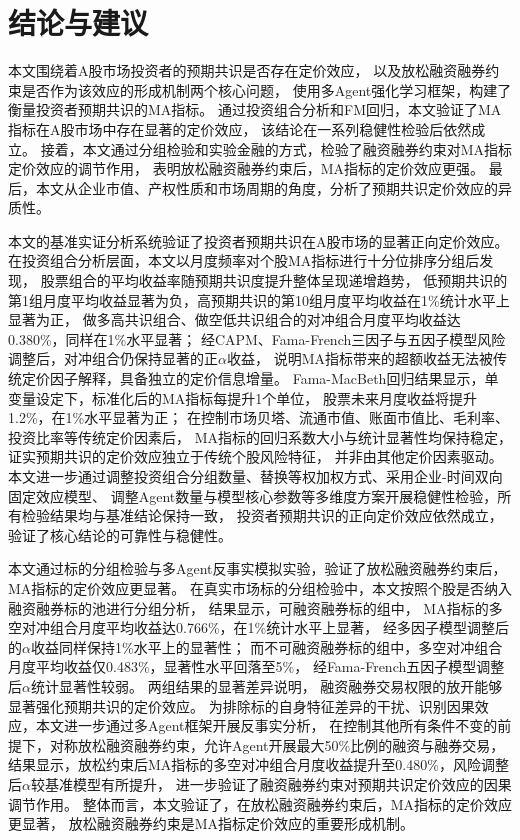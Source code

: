 
\chapter{结论与建议}

本文围绕着A股市场投资者的预期共识是否存在定价效应，
以及放松融资融券约束是否作为该效应的形成机制两个核心问题，
使用多Agent强化学习框架，构建了衡量投资者预期共识的MA指标。
通过投资组合分析和FM回归，本文验证了MA指标在A股市场中存在显著的定价效应，
该结论在一系列稳健性检验后依然成立。
接着，本文通过分组检验和实验金融的方式，检验了融资融券约束对MA指标定价效应的调节作用，
表明放松融资融券约束后，MA指标的定价效应更强。
最后，本文从企业市值、产权性质和市场周期的角度，分析了预期共识定价效应的异质性。

本文的基准实证分析系统验证了投资者预期共识在A股市场的显著正向定价效应。
在投资组合分析层面，本文以月度频率对个股MA指标进行十分位排序分组后发现，
股票组合的平均收益率随预期共识度提升整体呈现递增趋势，
低预期共识的第1组月度平均收益显著为负，高预期共识的第10组月度平均收益在1\%统计水平上显著为正，
做多高共识组合、做空低共识组合的对冲组合月度平均收益达0.380\%，同样在1\%水平显著；
经CAPM、Fama-French三因子与五因子模型风险调整后，对冲组合仍保持显著的正$\alpha$收益，
说明MA指标带来的超额收益无法被传统定价因子解释，具备独立的定价信息增量。
Fama-MacBeth回归结果显示，单变量设定下，标准化后的MA指标每提升1个单位，
股票未来月度收益将提升1.2\%，在1\%水平显著为正；
在控制市场贝塔、流通市值、账面市值比、毛利率、投资比率等传统定价因素后，
MA指标的回归系数大小与统计显著性均保持稳定，证实预期共识的定价效应独立于传统个股风险特征，
并非由其他定价因素驱动。
本文进一步通过调整投资组合分组数量、替换等权加权方式、采用企业-时间双向固定效应模型、
调整Agent数量与模型核心参数等多维度方案开展稳健性检验，所有检验结果均与基准结论保持一致，
投资者预期共识的正向定价效应依然成立，验证了核心结论的可靠性与稳健性。

本文通过标的分组检验与多Agent反事实模拟实验，验证了放松融资融券约束后，MA指标的定价效应更显著。
在真实市场标的分组检验中，本文按照个股是否纳入融资融券标的池进行分组分析，
结果显示，可融资融券标的组中，
MA指标的多空对冲组合月度平均收益达0.766\%，在1\%统计水平上显著，
经多因子模型调整后的$\alpha$收益同样保持1\%水平上的显著性；
而不可融资融券标的组中，多空对冲组合月度平均收益仅0.483\%，显著性水平回落至5\%，
经Fama-French五因子模型调整后$\alpha$统计显著性较弱。
两组结果的显著差异说明，
融资融券交易权限的放开能够显著强化预期共识的定价效应。
为排除标的自身特征差异的干扰、识别因果效应，本文进一步通过多Agent框架开展反事实分析，
在控制其他所有条件不变的前提下，对称放松融资融券约束，允许Agent开展最大50\%比例的融资与融券交易，
结果显示，放松约束后MA指标的多空对冲组合月度收益提升至0.480\%，风险调整后$\alpha$较基准模型有所提升，
进一步验证了融资融券约束对预期共识定价效应的因果调节作用。
整体而言，本文验证了，在放松融资融券约束后，MA指标的定价效应更显著，
放松融资融券约束是MA指标定价效应的重要形成机制。  


